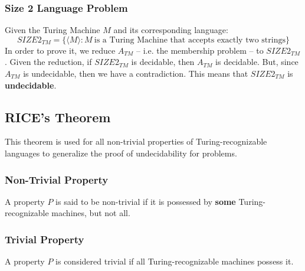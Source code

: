\documentclass{article}
\begin{document}
\subsubsection{Size 2 Language Problem}
Given the Turing Machine $M$ and its corresponding language:
\[ SIZE2_{TM} = \{ \langle M \rangle : M~\text{is a Turing Machine that accepts exactly two strings} \} \]
In order to prove it, we reduce $A_{TM}$ -- i.e. the membership problem -- to $SIZE2_{TM}$. Given the reduction, if $SIZE2_{TM}$ is decidable, then $A_{TM}$ is decidable. But, since $A_{TM}$ is undecidable, then we have a contradiction. This means that $SIZE2_{TM}$ is \textbf{undecidable}.

\subsection{RICE's Theorem}
This theorem is used for all non-trivial properties of Turing-recognizable languages to generalize the proof of undecidability for problems.

\subsubsection{Non-Trivial Property}
A property $P$ is said to be non-trivial if it is possessed by \textbf{some} Turing-recognizable machines, but not all.

\subsubsection{Trivial Property}
A property $P$ is considered trivial if all Turing-recognizable machines possess it.
\end{document}
